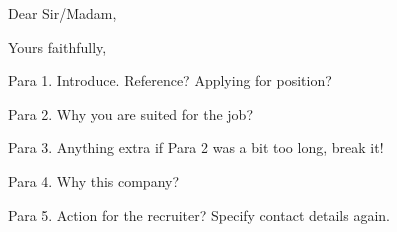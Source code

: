 \documentclass[10pt, a4paper, sans]{moderncv}
\begin{document}
\date{\today{}}
\opening{Dear Sir/Madam,}
\closing{Yours faithfully,}
\makelettertitle

Para 1. Introduce. Reference? Applying for position?

\medskip

Para 2. Why you are suited for the job?

\medskip

Para 3. Anything extra if Para 2 was a bit too long, break it!

\medskip

Para 4. Why this company?

\medskip

Para 5. Action for the recruiter? Specify contact details again.

\bigskip

\makeletterclosing
\end{document}
